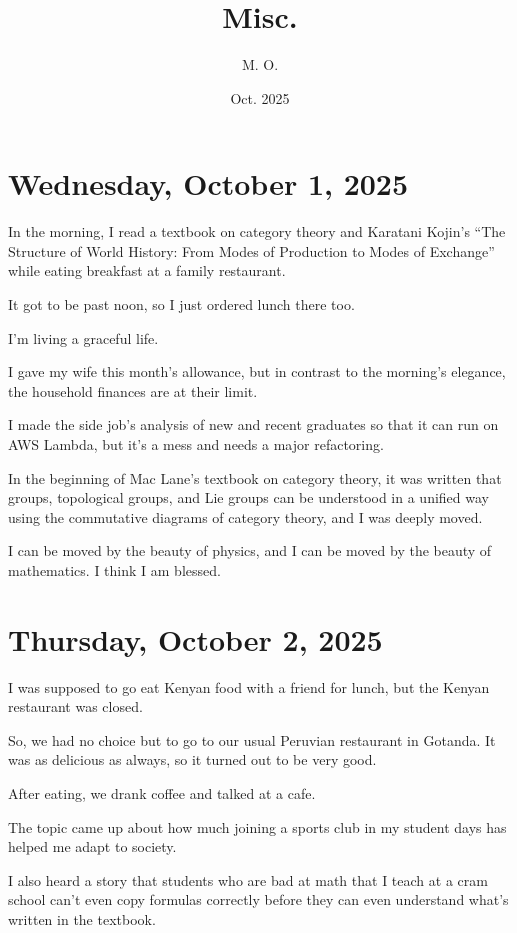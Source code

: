 \documentclass[uplatex]{jsarticle}
\title{
Misc.
}
\author{
M. O.
}
\date{Oct. 2025}
\begin{document}
\maketitle

\section{Wednesday, October 1, 2025}

In the morning, I read a textbook on category theory and Karatani Kojin's ``The Structure of World History: From Modes of Production to Modes of Exchange'' while eating breakfast at a family restaurant.

It got to be past noon, so I just ordered lunch there too.

I'm living a graceful life.

I gave my wife this month's allowance, but in contrast to the morning's elegance, the household finances are at their limit.

I made the side job's analysis of new and recent graduates so that it can run on AWS Lambda, but it's a mess and needs a major refactoring.

In the beginning of Mac Lane's textbook on category theory, it was written that groups, topological groups, and Lie groups can be understood in a unified way using the commutative diagrams of category theory, and I was deeply moved.

I can be moved by the beauty of physics, and I can be moved by the beauty of mathematics. I think I am blessed.


\section{Thursday, October 2, 2025}

I was supposed to go eat Kenyan food with a friend for lunch, but the Kenyan restaurant was closed.

So, we had no choice but to go to our usual Peruvian restaurant in Gotanda. It was as delicious as always, so it turned out to be very good.

After eating, we drank coffee and talked at a cafe.

The topic came up about how much joining a sports club in my student days has helped me adapt to society.

I also heard a story that students who are bad at math that I teach at a cram school can't even copy formulas correctly before they can even understand what's written in the textbook.
\end{document}
